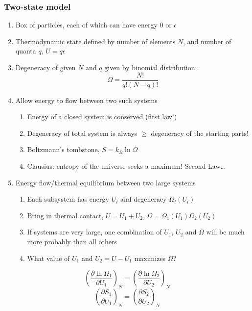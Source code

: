 \documentclass[11pt]{article}
\begin{document}
\subsubsection{Two-state model}
\label{sec:org29c16e9}
\begin{enumerate}
\item Box of particles, each of which can have energy 0 or \(\epsilon\)
\item Thermodynamic state defined by number of elements \(N\), and number of
quanta \(q\), \(U=q\epsilon\)
\item Degeneracy of given \(N\) and \(q\) given by binomial distribution:
\begin{displaymath}
  \Omega=\frac{N!}{q!(N-q)!}
\end{displaymath}
\item Allow energy to flow between two such systems
\begin{enumerate}
\item Energy of a closed system is conserved (first law!)
\item Degeneracy of total system is always \(\geq\) degeneracy of the
starting parts!
\item Boltzmann's tombstone, \(S = k_B \ln \Omega\)
\item Clausius: entropy of the universe seeks a maximum!  Second Law\ldots{}
\end{enumerate}
\item Energy flow/thermal equilibrium between two large systems
\begin{enumerate}
\item Each subsystem has energy \(U_i\) and degeneracy \(\Omega_i(U_i)\)
\item Bring in thermal contact, \(U=U_1+U_2\), \(\Omega=\Omega_1(U_1)\Omega_2(U_2)\)
\item If systems are very large, one combination of \(U_1\), \(U_2\) and \(\Omega\)
will be much more probably than all others
\item What value of \(U_1\) and \(U_2=U-U_1\) maximizes \(\Omega\)?
\end{enumerate}
\end{enumerate}
\begin{displaymath}
 \left ( \frac{\partial \ln \Omega_1}{\partial U_1} \right )_N = \left ( \frac{\partial \ln \Omega_2}{\partial U_2} \right )_N
\end{displaymath}
\begin{displaymath}
 \left ( \frac{\partial S_1}{\partial U_1} \right )_N = \left ( \frac{\partial S_2}{\partial U_2} \right )_N
\end{displaymath}
\end{document}

